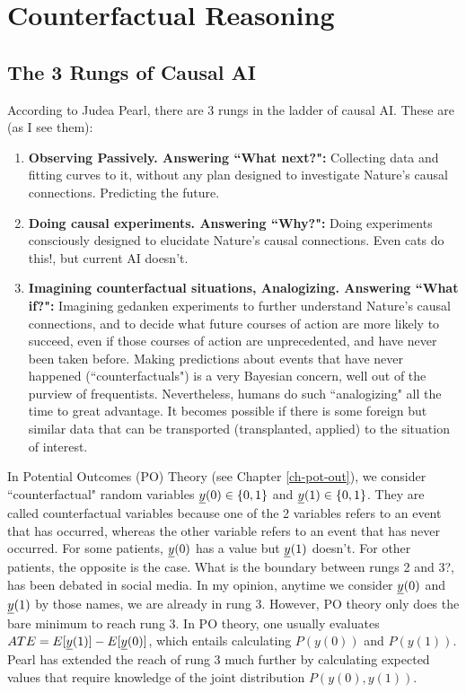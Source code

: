 \chapter{Counterfactual Reasoning}
\label{ch-counterf}


\section{The 3 Rungs of Causal AI}
According to
Judea Pearl,
there are 3 rungs in the
ladder of causal AI.
These are (as I see them):
\begin{enumerate}
\item
{\bf Observing Passively. Answering ``What next?":} Collecting
data
and fitting curves to it,
without any plan
designed to
investigate Nature's
causal connections. Predicting the future.
\item {\bf Doing causal
experiments. Answering ``Why?":}
Doing experiments
consciously designed to
elucidate
Nature's causal connections.
Even cats do this!, but current AI doesn't.
\item {\bf Imagining
 counterfactual situations, Analogizing. Answering ``What if?":}
Imagining gedanken experiments
to further understand
Nature's causal connections,
and to decide what future
courses of action are
more likely to succeed,
even if
those courses of action
are unprecedented, and have never been taken before.
Making
predictions about
 events that have never happened (``counterfactuals")
is a very Bayesian
concern, well out of the purview of
frequentists. Nevertheless,
humans do such
``analogizing"
all the time to great advantage.
It becomes
possible if there
is some foreign but similar
data that can be transported
(transplanted, applied)
to the situation of
interest.


\end{enumerate}


In Potential
Outcomes (PO) Theory
(see Chapter \ref{ch-pot-out}),
we consider  
``counterfactual"
random variables ${\underline{y}}(0)\in \{0,1\}$
and ${\underline{y}}(1)\in\{0,1\}$. They are called
counterfactual variables because
one of the 2 variables 
refers to an event that has occurred,
whereas the other variable
refers to an event that has never 
occurred. For some patients,
${\underline{y}}(0)$ has a value
but ${\underline{y}}(1)$
doesn't.
For other 
patients,
the opposite 
is the case.
What is the
boundary between rungs 2 and 3?,
has been debated in social media.
In my opinion, anytime
we consider ${\underline{y}}(0)$
and ${\underline{y}}(1)$ by those names,
we are already in rung 3.
However, PO theory 
only does the bare minimum 
to reach rung 3.
In PO theory, one usually
evaluates $ATE=E[{\underline{y}}(1)]-E[{\underline{y}}(0)]$,
which entails
calculating $P(y(0))$
and $P(y(1))$.
Pearl has extended the reach of rung 3
much further 
by calculating expected
values that require knowledge of
the joint distribution $P(y(0), y(1))$.



